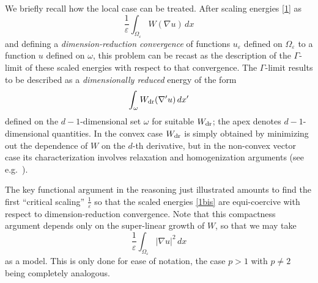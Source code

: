 \documentclass{article}
\newcommand{\e}{\varepsilon}
\begin{document}
We briefly recall how the local case can be treated.
After scaling energies \eqref{1} as
\begin{equation}\label{1bis}
\frac1\e\int_{\Omega_\e} W(\nabla u)\,dx
\end{equation}
and defining a {\em dimension-reduction convergence} of functions $u_\e$ defined on $\Omega_\e$ to a function $u$ defined on $\omega$, this problem can be recast as the
description of the $\Gamma$-limit of these scaled energies with respect to that convergence. The $\Gamma$-limit results to be described
as a {\em dimensionally reduced} energy of the form
\begin{equation}
\int_{\omega} W_{\rm dr}(\nabla' u)\,dx'
\end{equation}
defined on the $d-1$-dimensional set $\omega$ for suitable 
$W_{\rm dr}$; the apex denotes $d-1$-dimensional quantities.
In the convex case $W_{\rm dr}$ is simply obtained 
by minimizing out the dependence of $W$ on the $d$-th derivative, but 
in the non-convex vector case its characterization involves relaxation and
homogenization arguments (see e.g.~\cite{LDR,BFF}).

The key functional argument in the reasoning just illustrated amounts to find the first ``critical scaling'' $\frac1\e$ so that the scaled 
energies \eqref{1bis} are equi-coercive with respect to dimension-reduction convergence.
Note that this compactness argument depends only on the super-linear growth of $W$, so that
we may take 
$$
\frac1\e\int_{\Omega_\e} |\nabla u|^2\,dx
$$
as a model. This is only done for ease of notation, the case $p>1$ with $p\neq 2$ being completely analogous.
\end{document}
